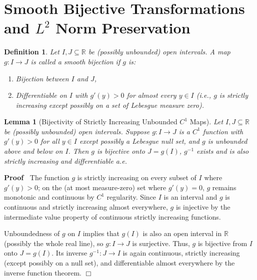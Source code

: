 \documentclass{article}
\newcommand{\tmem}[1]{{\em #1\/}}
\newenvironment{proof}{\noindent\textbf{Proof\ }}{\hspace*{\fill}$\Box$\medskip}
\newtheorem{definition}{Definition}
\newtheorem{lemma}{Lemma}
\begin{document}
\section{Smooth Bijective Transformations and $L^2$ Norm Preservation}

\begin{definition}
  \label{def:bijectiveC1}Let $I, J \subseteq \mathbb{R}$ be (possibly
  unbounded) open intervals. A map $g : I \to J$ is called a {\tmem{smooth
  bijection}} if $g$ is:
  \begin{enumerate}
    \item Bijection between $I$ and $J$,
    
    \item Differentiable on $I$ with $g' (y) > 0$ for almost every $y \in I$
    (i.e., $g$ is strictly increasing except possibly on a set of Lebesgue
    measure zero).
  \end{enumerate}
\end{definition}

\begin{lemma}
  [Bijectivity of Strictly Increasing Unbounded $C^1$
  Maps]\label{lem:bijective_unbounded} Let $I, J \subseteq \mathbb{R}$ be
  (possibly unbounded) open intervals. Suppose $g : I \to J$ is a $C^1$
  function with $g' (y) > 0$ for all $y \in I$ except possibly a Lebesgue null
  set, and $g$ is unbounded above and below on $I$. Then $g$ is bijective onto
  $J = g (I)$, $g^{- 1}$ exists and is also strictly increasing and
  differentiable a.e.
\end{lemma}

\begin{proof}
  The function $g$ is strictly increasing on every subset of $I$ where $g' (y)
  > 0$; on the (at most measure-zero) set where $g' (y) = 0$, $g$ remains
  monotonic and continuous by $C^1$ regularity. Since $I$ is an interval and
  $g$ is continuous and strictly increasing almost everywhere, $g$ is
  injective by the intermediate value property of continuous strictly
  increasing functions.
  
  Unboundedness of $g$ on $I$ implies that $g (I)$ is also an open interval in
  $\mathbb{R}$ (possibly the whole real line), so $g : I \to J$ is surjective.
  Thus, $g$ is bijective from $I$ onto $J = g (I)$. Its inverse $g^{- 1} : J
  \to I$ is again continuous, strictly increasing (except possibly on a null
  set), and differentiable almost everywhere by the inverse function theorem.
\end{proof}
\end{document}
